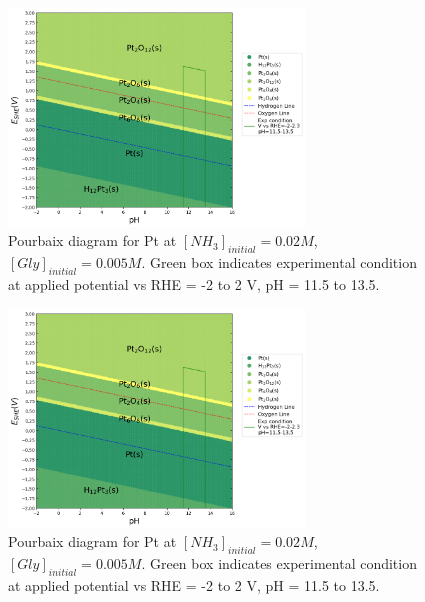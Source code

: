 \documentclass[journal=jacsat,manuscript=article,email=false]{achemso}
\begin{document}
\begin{figure}[htbp]
    \centering
    \includegraphics[width=0.7\textwidth]{Figures/pourbaix_diagrams/Pt-NH3-H2O_activity=1e-04_[NH3]=0M_[Gly]=0M_[CN]=0.png}
    \caption{Pourbaix diagram for Pt at $[NH_3]_{initial}= 0.02M$, $[Gly]_{initial}=0.005M$. Green box indicates experimental condition at applied potential vs RHE = -2 to 2 V, pH = 11.5 to 13.5.}
    \label{fig:Pt_Pourbaix_NH3_Gly_SI}
\end{figure}
\begin{figure}[htbp]
    \centering
    \includegraphics[width=0.7\textwidth]{Figures/pourbaix_diagrams/Pt-NH3-H2O_activity=1e-04_[NH3]=0.02M_[Gly]=0.005M_[CN]=0.png}
    \caption{Pourbaix diagram for Pt at $[NH_3]_{initial}= 0.02M$, $[Gly]_{initial}=0.005M$. Green box indicates experimental condition at applied potential vs RHE = -2 to 2 V, pH = 11.5 to 13.5.}
    \label{fig:Pt_Pourbaix_NH3_Gly_SI}
\end{figure}
\end{document}
